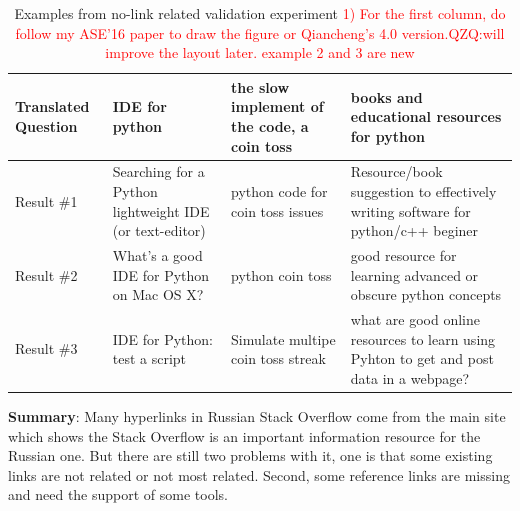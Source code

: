  \begin{table}
 \caption{Examples from no-link related validation experiment \textcolor{red}{1) For the first column, do follow my ASE'16 paper to draw the figure or Qiancheng's 4.0 version.QZQ:will improve the layout later. example 2 and 3 are new}}
 \centering
 \tiny
 \label{tab:reviewresult}
 \begin{tabular}{|p{1cm}|p{4cm}|p{4cm}|p{4cm}|}
 	\hline
 	Translated Question & IDE for python & the slow implement of the code, a coin toss & books and educational resources for python\\
 	\hline
 	Result \#1 & Searching for a Python lightweight IDE (or text-editor) & python code for coin toss issues & Resource/book suggestion to effectively writing software for python/c++ beginer\\
 	\hline
 	Result \#2 & What's a good IDE for Python on Mac OS X? & python coin toss & good resource for learning advanced or obscure python concepts \\
 	\hline
 	Result \#3 & IDE for Python: test a script & Simulate multipe coin toss streak & what are good online resources to learn using Pyhton to get and post data in a webpage?\\
	
 	\hline
 \end{tabular}
 
 \end{table}


\textbf{Summary}: 
Many hyperlinks in Russian Stack Overflow come from the main site which shows the Stack Overflow is an important information resource for the Russian one.
But there are still two problems with it, one is that some existing links are not related or not most related.
Second, some reference links are missing and need the support of some tools.
